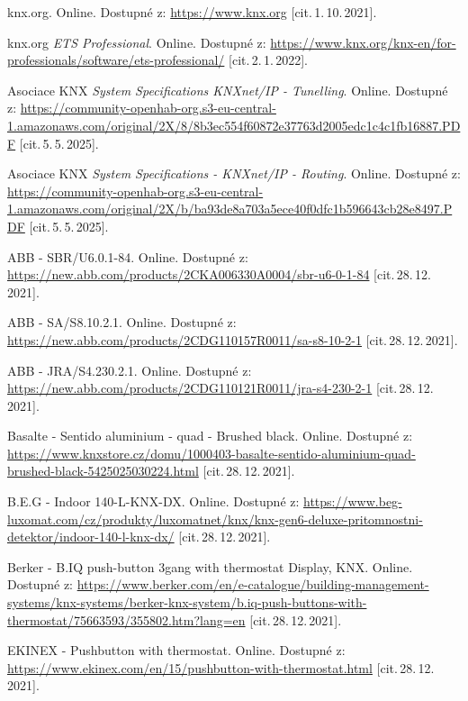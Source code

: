 \begin{thebibliography}{99}
		knx.org.\/ Online.
		Dostupné z:
    \url{https://www.knx.org}
		[cit.\,1.\,10.\,2021]. 
    
		knx.org \emph{ETS Professional}.\/ Online.
		Dostupné z:
    \url{https://www.knx.org/knx-en/for-professionals/software/ets-professional/}
		[cit.\,2.\,1.\,2022]. 

		Asociace KNX \emph{System Specifications KNXnet/IP - Tunelling}.\/ Online.
		Dostupné z:
	\url{https://community-openhab-org.s3-eu-central-1.amazonaws.com/original/2X/8/8b3ec554f60872e37763d2005edc1c4c1fb16887.PDF}
		[cit.\,5.\,5.\,2025].

		Asociace KNX \emph{System Specifications - KNXnet/IP - Routing}.\/ Online.
		Dostupné z:
	\url{https://community-openhab-org.s3-eu-central-1.amazonaws.com/original/2X/b/ba93de8a703a5ece40f0dfc1b596643cb28e8497.PDF}
		[cit.\,5.\,5.\,2025].

		ABB - SBR/U6.0.1-84.\/ Online. 
		Dostupné z:
    \url{https://new.abb.com/products/2CKA006330A0004/sbr-u6-0-1-84}
		[cit.\,28.\,12.\,2021].
    
		ABB - SA/S8.10.2.1.\/ Online.
		Dostupné z:
    \url{https://new.abb.com/products/2CDG110157R0011/sa-s8-10-2-1}
		[cit.\,28.\,12.\,2021]. 
    
		ABB - JRA/S4.230.2.1.\/ Online. 
		Dostupné z:
    \url{https://new.abb.com/products/2CDG110121R0011/jra-s4-230-2-1}
		[cit.\,28.\,12.\,2021].
    
		Basalte - Sentido aluminium - quad - Brushed black.\/ Online.
		Dostupné z:
    \url{https://www.knxstore.cz/domu/1000403-basalte-sentido-aluminium-quad-brushed-black-5425025030224.html}
		[cit.\,28.\,12.\,2021]. 
    
		B.E.G - Indoor 140-L-KNX-DX.\/ Online. 
		Dostupné z:
    \url{https://www.beg-luxomat.com/cz/produkty/luxomatnet/knx/knx-gen6-deluxe-pritomnostni-detektor/indoor-140-l-knx-dx/}
		[cit.\,28.\,12.\,2021].  
    
		Berker - B.IQ push-button 3gang with thermostat Display, KNX.\/ Online. 
		Dostupné z:
    \url{https://www.berker.com/en/e-catalogue/building-management-systems/knx-systems/berker-knx-system/b.iq-push-buttons-with-thermostat/75663593/355802.htm?lang=en}
		[cit.\,28.\,12.\,2021].
    
		EKINEX - Pushbutton with thermostat.\/ Online. 
		Dostupné z:
    \url{https://www.ekinex.com/en/15/pushbutton-with-thermostat.html}
		[cit.\,28.\,12.\,2021].
    

\end{thebibliography}
